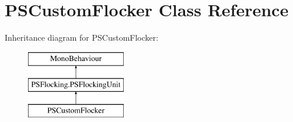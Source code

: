 \hypertarget{class_p_s_custom_flocker}{}\section{P\+S\+Custom\+Flocker Class Reference}
\label{class_p_s_custom_flocker}
Inheritance diagram for P\+S\+Custom\+Flocker\+:\begin{figure}[H]
\begin{center}
\leavevmode
\includegraphics[height=3.000000cm]{class_p_s_custom_flocker}
\end{center}
\end{figure}
